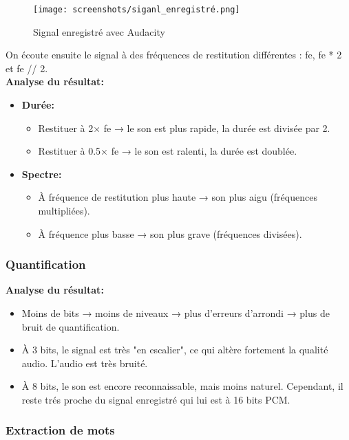 \begin{figure}[!h]
\begin{center}
\texttt{[image: screenshots/siganl\_enregistré.png]}
\end{center}
\caption{Signal enregistré avec Audacity}
\end{figure} 

On écoute ensuite le signal à des fréquences de restitution différentes : {fe}, {fe * 2} et {fe // 2}.\\

{\bf{Analyse du résultat:}}\\
\begin{itemize}
    \item {\bf{Durée:}} 
    \begin{itemize}
        \item Restituer à 2× fe → le son est plus rapide, la durée est divisée par 2.
        \item Restituer à 0.5× fe → le son est ralenti, la durée est doublée.
    \end{itemize}
    \item {\bf{Spectre:}} 
    \begin{itemize}
        \item À fréquence de restitution plus haute → son plus aigu (fréquences multipliées).
        \item À fréquence plus basse → son plus grave (fréquences divisées).
    \end{itemize}
\end{itemize}

\newpage
\subsubsection{Quantification}

{\bf{Analyse du résultat:}}
\begin{itemize}
    \item Moins de bits → moins de niveaux → plus d’erreurs d’arrondi → plus de bruit de quantification.
    \item À 3 bits, le signal est très "en escalier", ce qui altère fortement la qualité audio. L'audio est très bruité.
    \item À 8 bits, le son est encore reconnaissable, mais moins naturel. Cependant, il reste trés proche du signal enregistré qui lui est à 16 bits PCM.
\end{itemize}

\subsubsection{Extraction de mots}

